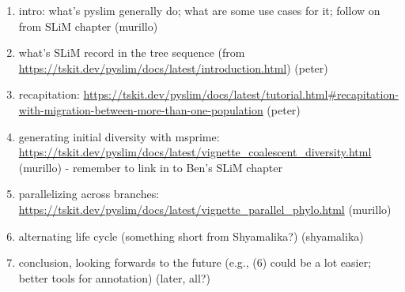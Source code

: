 \documentclass[12pt]{article}
\begin{document}
\begin{enumerate}
    \item   intro: what's pyslim generally do;
        what are some use cases for it; follow on from SLiM chapter (murillo)
    \item   what's SLiM record in the tree sequence
        (from \url{https://tskit.dev/pyslim/docs/latest/introduction.html}) (peter)
    \item   recapitation:
        \url{https://tskit.dev/pyslim/docs/latest/tutorial.html#recapitation-with-migration-between-more-than-one-population}  (peter)
    \item   generating initial diversity with msprime:
        \url{https://tskit.dev/pyslim/docs/latest/vignette_coalescent_diversity.html} (murillo)
        - remember to link in to Ben's SLiM chapter
    \item   parallelizing across branches:
        \url{https://tskit.dev/pyslim/docs/latest/vignette_parallel_phylo.html} (murillo)
    \item   alternating life cycle (something short from Shyamalika?) (shyamalika)
    \item   conclusion, looking forwards to the future (e.g., (6) could be a lot easier; better tools for annotation) (later, all?)
\end{enumerate}
\end{document}
